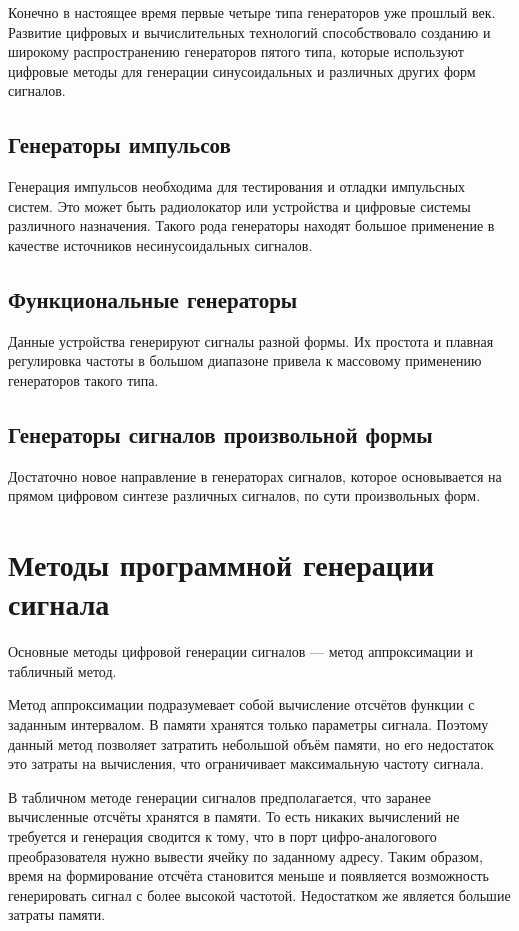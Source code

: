 Конечно в настоящее время первые четыре типа генераторов уже прошлый век. Развитие цифровых и вычислительных технологий способствовало созданию и широкому распространению генераторов пятого типа, которые используют цифровые методы для генерации синусоидальных и различных других форм сигналов.




\subsection{Генераторы импульсов}
Генерация импульсов необходима для тестирования и отладки импульсных систем. Это может быть радиолокатор или устройства и цифровые системы различного назначения. Такого рода генераторы находят большое применение в качестве источников несинусоидальных сигналов.

\subsection{Функциональные генераторы}
Данные устройства генерируют сигналы разной формы. Их простота и плавная регулировка частоты в большом диапазоне привела к массовому применению генераторов такого типа.

\subsection{Генераторы сигналов произвольной формы}
Достаточно новое направление в генераторах сигналов, которое основывается на прямом цифровом синтезе различных сигналов, по сути произвольных форм.



\section{Методы программной генерации сигнала}
	Основные методы цифровой генерации сигналов --- метод аппроксимации и табличный метод.
	
	Метод аппроксимации подразумевает собой вычисление отсчётов функции с заданным интервалом. В памяти хранятся только параметры сигнала. Поэтому данный метод позволяет затратить небольшой объём памяти, но его недостаток это затраты на вычисления, что ограничивает максимальную частоту сигнала.
	
	В табличном методе генерации сигналов предполагается, что заранее вычисленные отсчёты хранятся в памяти. То есть никаких вычислений не требуется и генерация сводится к тому, что в порт цифро-аналогового преобразователя нужно вывести ячейку по заданному адресу. Таким образом, время на формирование отсчёта становится меньше и появляется возможность генерировать сигнал с более высокой частотой. Недостатком же является большие затраты памяти.
	
	
	
	